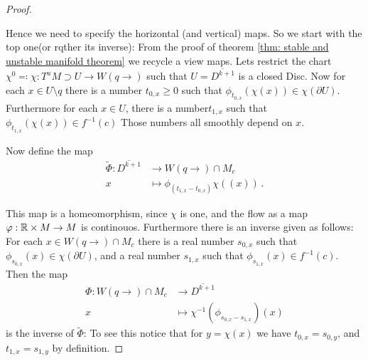 \begin{proof}
\begin{center}
\end{center}
Hence we need to specify the horizontal (and vertical) maps. 
So we start with the top one(or rqther its inverse):
From the proof of theorem \ref{thm: stable and unstable manifold theorem} we recycle a view maps. 
Lets restrict the chart $\chi^0 \eqcolon \chi:T^uM\supset U\to W(q\to)$ such that $U=\overline{D^{k+1}}$ is a closed Disc. Now for each 
$x\in  U\setminus q$ there is a number $t_{0,x}\geq 0$ such that $\phi_{t_{0,x}}(\chi(x))\in \chi(\partial U)$. Furthermore for each $x\in  U$, there is a number$t_{1,x}$ such that $\phi_{t_{1,x}}(\chi(x))\in f^{-1}(c)$ Those numbers all smoothly depend on $x$.

Now define the map
\begin{align*}
	\tilde{\Phi}:	\overline {D^{k+1}}			&\to 		W(q\to)\cap M_c\\
	x				&\mapsto	\phi_{(t_{1,x}-t_{0,x})}\chi((x)) \, .
\end{align*}


This map is a homeomorphism, since $\chi$ is one, and the flow as a map $\varphi: \mathbb{R} \times M \to M$ is continouos. Furthermore there is an inverse given as follows: For each $x\in W(q\to)\cap M_c$ there is a real number $s_{0,x}$ such that $\phi_{s_{0,x}}(x)\in \chi(\partial U)$, and a real number $s_{1,x}$ such that $\phi_{s_{1,x}}(x)\in f^{-1}(c)$. Then the map 
\begin{align*}
	\Phi: W(q\to)\cap M_c 	&\to     \overline {D^{k+1}} \\
	x						&\mapsto \chi^{-1}(\phi_{s_{0,x}-s_{1,x}})(x)
\end{align*}
is the inverse of $\tilde{\Phi}$: To see this notice that for $y=\chi(x)$ we have $t_{0,x}=s_{0,y}$, and $t_{1,x}=s_{1,y}$ by definition. 




\end{proof}
